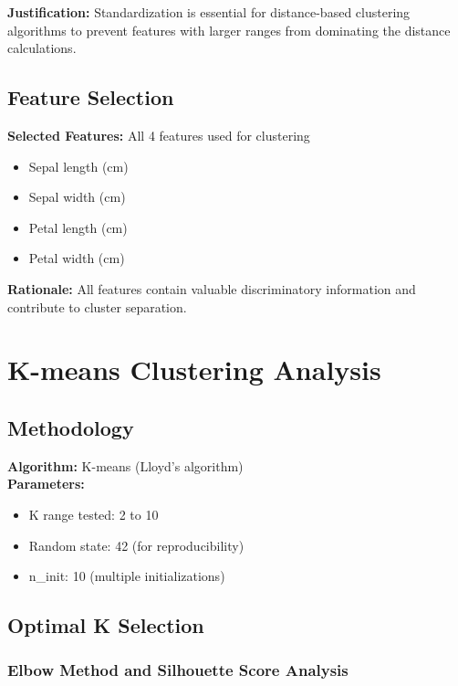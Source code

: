 \documentclass[12pt,a4paper]{article}
\begin{document}
\textbf{Justification:} Standardization is essential for distance-based clustering algorithms to prevent features with larger ranges from dominating the distance calculations.

\subsection{Feature Selection}

\textbf{Selected Features:} All 4 features used for clustering
\begin{itemize}
    \item Sepal length (cm)
    \item Sepal width (cm)
    \item Petal length (cm)
    \item Petal width (cm)
\end{itemize}

\textbf{Rationale:} All features contain valuable discriminatory information and contribute to cluster separation.

\newpage

\section{K-means Clustering Analysis}

\subsection{Methodology}

\textbf{Algorithm:} K-means (Lloyd's algorithm)\\
\textbf{Parameters:}
\begin{itemize}
    \item K range tested: 2 to 10
    \item Random state: 42 (for reproducibility)
    \item n\_init: 10 (multiple initializations)
\end{itemize}

\subsection{Optimal K Selection}

\subsubsection{Elbow Method and Silhouette Score Analysis}
\end{document}
